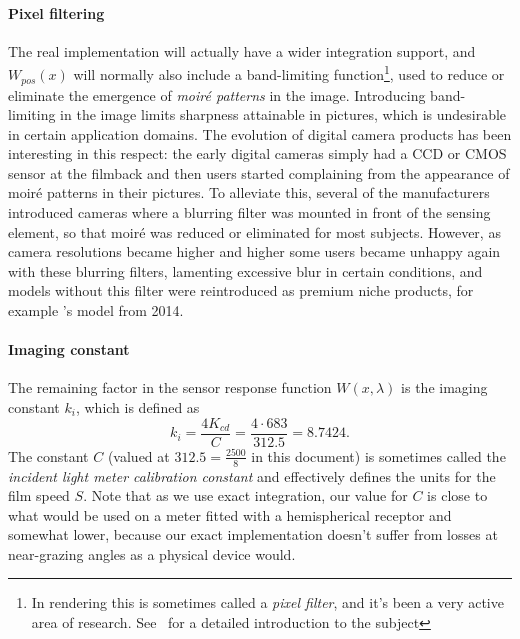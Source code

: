 \paragraph{Pixel filtering}
The real implementation will actually have a wider integration support,
and $W_{pos}(x)$ will normally also include a band-limiting function\footnote{
	In rendering this is sometimes called a \textsl{\gls{pixel filter}}, and it's 
	been a very active area of research. See~\cite{pharr2023} for a detailed
	introduction to the subject}, 
used to reduce or eliminate the emergence of \emph{moir\'e patterns} in the image. 
Introducing band-limiting in the image limits sharpness attainable in pictures,
which is undesirable in certain application domains. 
The evolution of digital camera products has been interesting in this respect:
the early digital cameras simply had a \gls{CCD} or \gls{CMOS} sensor at the 
filmback and then users started complaining from the appearance of moir\'e 
patterns in their pictures. 
To alleviate this, several of the manufacturers introduced cameras where a 
blurring filter was mounted in front of the sensing element, 
so that moir\'e was reduced or eliminated for most subjects. 
However, as camera resolutions became higher and higher some users became unhappy again
with these blurring filters, lamenting excessive blur in certain conditions, 
and models without this filter were reintroduced as premium niche products, 
for example 's  model from 2014.


\paragraph{Imaging constant}

The remaining factor in the sensor response function $W(x,\lambda)$ is the
imaging constant $k_i$, which is defined as
\begin{equation}\label{eqn:imaging_ki}
	k_i = \frac{4K_{cd}}{C} = \frac{4\cdot683}{312.5} = 8.7424.
\end{equation}
The constant $C$ (valued at $312.5 = \frac{2500}8$ in this document) is sometimes called the \textsl{incident light meter
calibration constant} and effectively defines the units for the \gls{film speed} $S$.
Note that as we use exact integration, our value for $C$ is close to what would be used on a meter fitted with a hemispherical receptor and somewhat lower, because our exact implementation doesn't suffer from losses at near-grazing angles as a physical device would.

